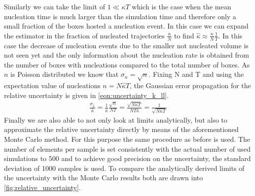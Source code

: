Similarly we can take the limit of $1 \ll \kappa T$ which is the case when the mean nucleation time is much larger than the simulation time and therefore only a small fraction of the boxes hosted a nucleation event. In this case we can expand the estimator in the fraction of nucleated trajectories $\frac{n}{N}$ to find $\hat{\kappa} \approx \frac{n}{N} \frac{1}{T}$. In this case the decrease of nucleation events due to the smaller not nucleated volume is not seen yet and the only information about the nucleation rate is obtained from the number of boxes with nucleations compared to the total number of boxes. As $n$ is Poisson distributed we know that $\sigma_n = \sqrt{n}$. Fixing N and T and using the expectation value of nucleations $n = N \hat{\kappa} T$, the Gaussian error propagation for the relative uncertainty is given in \autoref{eqn:uncertainty_k_ll}.
\begin{align}
\label{eqn:uncertainty_k_ll}
\frac{\sigma_{\hat{\kappa}}}{\hat{\kappa}} = \frac{1}{\hat{\kappa}} \frac{\sqrt{n}}{NT} =\frac{\sqrt{N \hat{\kappa} T}}{N T \hat{\kappa}} =\frac{1}{\sqrt{N \hat{\kappa} T}}
\end{align}
Finally we are also able to not only look at limits analytically, but also to approximate the relative uncertainty directly by means of the aforementioned Monte Carlo method. For this purpose the same procedure as before is used. The number of elements per sample is set consistently with the actual number of used simulations to 500 and to achieve good precision on the uncertainty, the standard deviation of 1000 samples is used. To compare the analytically derived limits of the uncertainty with the Monte Carlo results both are drawn into \autoref{fig:relative_uncertainty}.

